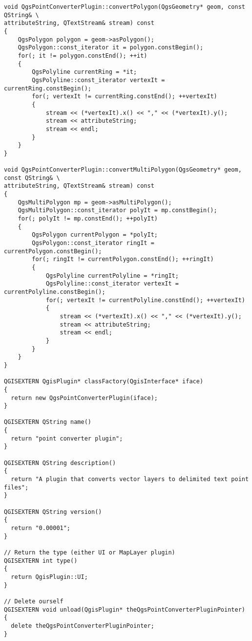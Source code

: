 \begin{verbatim}
void QgsPointConverterPlugin::convertPolygon(QgsGeometry* geom, const QString& \
attributeString, QTextStream& stream) const
{
    QgsPolygon polygon = geom->asPolygon();
    QgsPolygon::const_iterator it = polygon.constBegin();
    for(; it != polygon.constEnd(); ++it)
    {
        QgsPolyline currentRing = *it;
        QgsPolyline::const_iterator vertexIt = currentRing.constBegin();
        for(; vertexIt != currentRing.constEnd(); ++vertexIt)
        {
            stream << (*vertexIt).x() << "," << (*vertexIt).y();
            stream << attributeString;
            stream << endl;
        }
    }
}

void QgsPointConverterPlugin::convertMultiPolygon(QgsGeometry* geom, const QString& \
attributeString, QTextStream& stream) const
{
    QgsMultiPolygon mp = geom->asMultiPolygon();
    QgsMultiPolygon::const_iterator polyIt = mp.constBegin();
    for(; polyIt != mp.constEnd(); ++polyIt)
    {
        QgsPolygon currentPolygon = *polyIt;
        QgsPolygon::const_iterator ringIt = currentPolygon.constBegin();
        for(; ringIt != currentPolygon.constEnd(); ++ringIt)
        {
            QgsPolyline currentPolyline = *ringIt;
            QgsPolyline::const_iterator vertexIt = currentPolyline.constBegin();
            for(; vertexIt != currentPolyline.constEnd(); ++vertexIt)
            {
                stream << (*vertexIt).x() << "," << (*vertexIt).y();
                stream << attributeString;
                stream << endl;
            }
        }
    }
}

QGISEXTERN QgisPlugin* classFactory(QgisInterface* iface)
{
  return new QgsPointConverterPlugin(iface);
}

QGISEXTERN QString name()
{
  return "point converter plugin";
}

QGISEXTERN QString description()
{
  return "A plugin that converts vector layers to delimited text point files";
}

QGISEXTERN QString version()
{
  return "0.00001";
}

// Return the type (either UI or MapLayer plugin)
QGISEXTERN int type()
{
  return QgisPlugin::UI;
}

// Delete ourself
QGISEXTERN void unload(QgisPlugin* theQgsPointConverterPluginPointer)
{
  delete theQgsPointConverterPluginPointer;
}

\end{verbatim}

